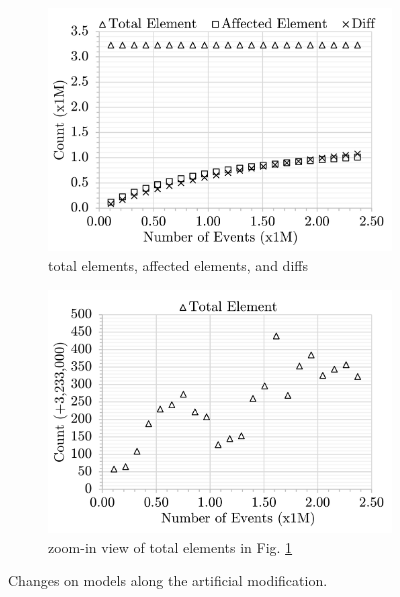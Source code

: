 \documentclass{llncs}
\begin{document}
\begin{figure}[ht]
    \centering
    \begin{subfigure}[t]{0.495\linewidth}
        \includegraphics[width=\linewidth]{images/ModificationCourse}
        \caption{total elements, affected elements, and diffs}
        \label{fig:modification_course}
    \end{subfigure}
    \hfill
    \begin{subfigure}[t]{0.495\linewidth}
        \includegraphics[width=\linewidth]{images/ModelSize}
        \caption{zoom-in view of total elements in Fig. \ref{fig:modification_course}}
        \label{fig:model_size}
    \end{subfigure}
    \caption{Changes on models along the artificial modification.}
    \label{fig:modification_model_size}
\end{figure}
\end{document}
